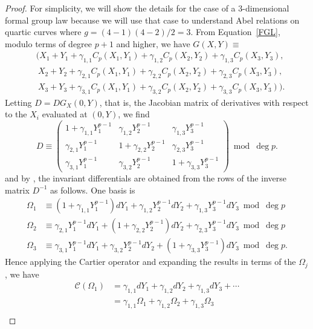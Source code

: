 \documentclass[12pt]{amsart}
\theoremstyle{theorem}
\begin{document}
\begin{proof}
For simplicity, we will show the details for the case of a $3$-dimensional formal group law because we will 
use that case to understand Abel relations on quartic curves where $g = (4-1)(4-2)/2 = 3$.  From 
Equation~\eqref{FGL}, modulo terms of degree $p+1$ and higher, we have   $G(X,Y) \equiv $
\begin{align}
\label{fgrouplaw}
&(X_1+Y_1 + \gamma_{1,1} C_p(X_1,Y_1) + \gamma_{1,2} C_p(X_2,Y_2) + \gamma_{1,3}C_p(X_3,Y_3),  \nonumber \\
&\ X_2+Y_2 + \gamma_{2,1} C_p(X_1,Y_1) + \gamma_{2,2} C_p(X_2,Y_2) + \gamma_{2,3}C_p(X_3,Y_3), \\
&\ X_3+Y_3 + \gamma_{3,1} C_p(X_1,Y_1) + \gamma_{3,2} C_p(X_2,Y_2) + \gamma_{3,3}C_p(X_3,Y_3) ). \nonumber
\end{align}
Letting $D = DG_X(0,Y)$, that is, the Jacobian matrix of derivatives with respect to the $X_i$ evaluated at $(0,Y)$, we find
$$D \equiv \begin{pmatrix} 1 + \gamma_{1,1} Y_1^{p-1} & \gamma_{1,2} Y_2^{p-1} & \gamma_{1,3} Y_3^{p-1} \\
                                     \gamma_{2,1} Y_1^{p-1} & 1 + \gamma_{2,2} Y_2^{p-1} & \gamma_{2,3} Y_3^{p-1}\\
                                     \gamma_{3,1} Y_1^{p-1} & \gamma_{3,2} Y_2^{p-1} & 1 +  \gamma_{3,3} Y_3^{p-1} \end{pmatrix} \bmod \deg p.$$
and by \cite[p. 243]{Freije}, the invariant differentials are obtained from the rows of the inverse matrix $D^{-1}$ as follows.  One
basis is
\begin{align}
\label{InvDiffsJ}
\Omega_1 &\equiv (1 + \gamma_{1,1}Y_1^{p-1}) dY_1 + \gamma_{1,2} Y_2^{p-1} dY_2 + \gamma_{1,3} Y_3^{p-1} dY_3  \bmod \deg p\nonumber \\
\Omega_2 &\equiv   \gamma_{2,1}Y_1^{p-1} dY_1 + (1 + \gamma_{2,2} Y_2^{p-1}) dY_2 + \gamma_{2,3} Y_3^{p-1} dY_3  \bmod \deg p\\
\Omega_3 &\equiv   \gamma_{3,1}Y_1^{p-1} dY_1 + \gamma_{3,2} Y_2^{p-1} dY_2 + (1 + \gamma_{3,3} Y_3^{p-1}) dY_3  \bmod \deg p. \nonumber
\end{align} 
Hence applying the Cartier operator and expanding the results in terms of the $\Omega_j$, we have 
\begin{align}
\label{CInvDIffsJ}
\mathcal{C}(\Omega_1) &= \gamma_{1,1} dY_1 + \gamma_{1,2} dY_2+ \gamma_{1,3} dY_3 + \cdots \nonumber\\
&= \gamma_{1,1} \Omega_1 + \gamma_{1,2}\Omega_2 + \gamma_{1,3} \Omega_3\nonumber \\

\end{align}
\end{proof}
\end{document}
